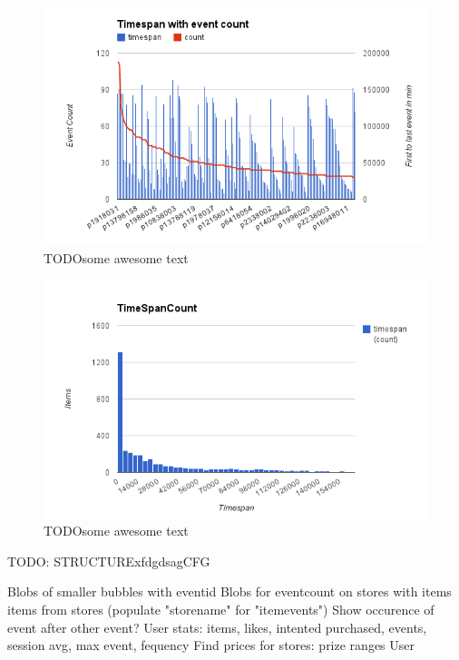     \begin{figure}[H]
        \includegraphics[width=5in]{image/item-timespan-event-count.png}
        \centering
        \caption[Count of sessions per user mapped with count of user with give
        session amount]{TODOsome awesome text}
    \end{figure}

    \begin{figure}[H]
        \includegraphics[width=5in]{image/time-span-count.png}
        \centering
        \caption[Count of sessions per user mapped with count of user with give
        session amount]{TODOsome awesome text}
    \end{figure}



    TODO: STRUCTURExfdgdsagCFG

        Blobs of smaller bubbles with eventid
        Blobs for eventcount on stores with items items from stores (populate "storename" for "itemevents")
        Show occurence of event after other event?
        User stats: items, likes, intented purchased, events, session avg, max event, fequency
        Find prices for stores: prize ranges
        User

